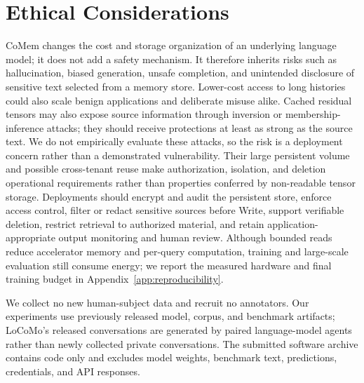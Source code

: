 \section{Ethical Considerations}
\label{sec:ethics}
CoMem changes the cost and storage organization of an underlying language model;
it does not add a safety mechanism. It therefore inherits risks such as
hallucination, biased generation, unsafe completion, and unintended disclosure
of sensitive text selected from a memory store. Lower-cost access to long
histories could also scale benign applications and deliberate misuse alike.
Cached residual tensors may also expose source information through inversion or
membership-inference attacks; they should receive protections at least as strong
as the source text. We do not empirically evaluate these attacks, so the risk is
a deployment concern rather than a demonstrated vulnerability. Their large persistent volume and possible cross-tenant reuse
make authorization, isolation, and deletion operational requirements rather than
properties conferred by non-readable tensor storage. Deployments should encrypt and audit the persistent store,
enforce access control, filter or redact sensitive sources before Write, support
verifiable deletion, restrict retrieval to authorized material, and retain
application-appropriate output monitoring and human review. Although bounded reads reduce accelerator memory
and per-query computation, training and large-scale evaluation still consume
energy; we report the measured hardware and final training budget in
Appendix~\ref{app:reproducibility}.

We collect no new human-subject data and recruit no annotators. Our experiments
use previously released model, corpus, and benchmark artifacts; LoCoMo's released
conversations are generated by paired language-model agents rather than newly
collected private conversations. The submitted software archive contains code
only and excludes model weights, benchmark text, predictions, credentials, and
API responses.
